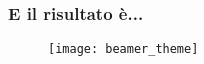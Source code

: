 \begin{frame}
 
 \frametitle{E il risultato è...}
 
 \begin{figure}[h]
  \centering
  \texttt{[image: beamer\_theme]}
  \label{img:maketitle}
 \end{figure}
 
\end{frame}
